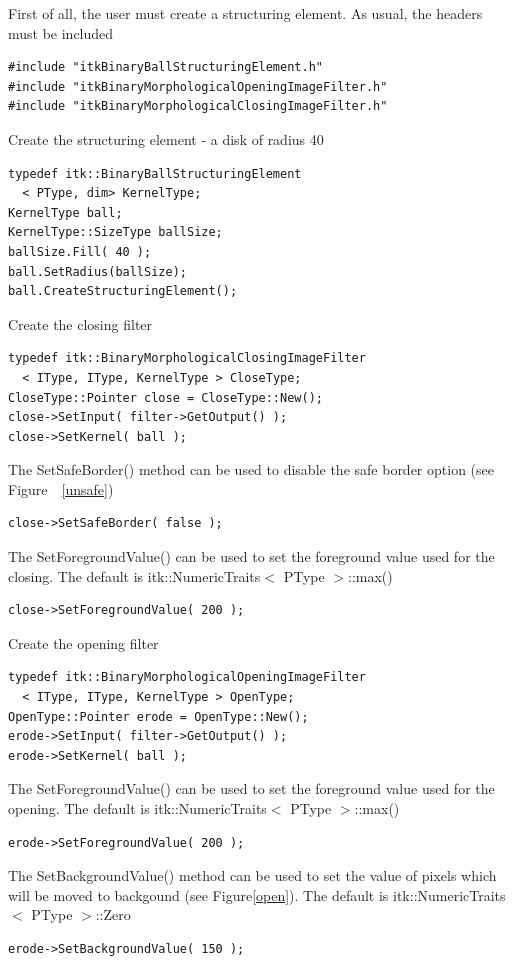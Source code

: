\documentclass[IJ]{cesj}
\begin{document}
First of all, the user must create a structuring element. As usual, the headers must be included

\begin{lstlisting}
#include "itkBinaryBallStructuringElement.h"
#include "itkBinaryMorphologicalOpeningImageFilter.h"
#include "itkBinaryMorphologicalClosingImageFilter.h"
\end{lstlisting}
Create the structuring element - a disk of radius 40
\begin{lstlisting}
typedef itk::BinaryBallStructuringElement
  < PType, dim> KernelType;
KernelType ball;
KernelType::SizeType ballSize;
ballSize.Fill( 40 );
ball.SetRadius(ballSize);
ball.CreateStructuringElement();
\end{lstlisting}
Create the closing filter
\begin{lstlisting}
typedef itk::BinaryMorphologicalClosingImageFilter
  < IType, IType, KernelType > CloseType;
CloseType::Pointer close = CloseType::New();
close->SetInput( filter->GetOutput() );
close->SetKernel( ball );
\end{lstlisting}
The SetSafeBorder() method can be used to disable the safe border option (see Figure~~\ref{unsafe})
\begin{lstlisting}
close->SetSafeBorder( false );
\end{lstlisting}
The SetForegroundValue() can be used to set the foreground value used for the closing. The default is itk::NumericTraits$<$ PType $>$::max()
\begin{lstlisting}
close->SetForegroundValue( 200 );
\end{lstlisting}
Create the opening filter
\begin{lstlisting}
typedef itk::BinaryMorphologicalOpeningImageFilter
  < IType, IType, KernelType > OpenType;
OpenType::Pointer erode = OpenType::New();
erode->SetInput( filter->GetOutput() );
erode->SetKernel( ball );
\end{lstlisting}
The SetForegroundValue() can be used to set the foreground value used for the opening. The default is itk::NumericTraits$<$ PType $>$::max()
\begin{lstlisting}
erode->SetForegroundValue( 200 );
\end{lstlisting}
The SetBackgroundValue() method can be used to set the value of pixels which will be moved to backgound (see Figure\ref{open}). The default is itk::NumericTraits$<$ PType $>$::Zero
\begin{lstlisting}
erode->SetBackgroundValue( 150 );
\end{lstlisting}
\end{document}
